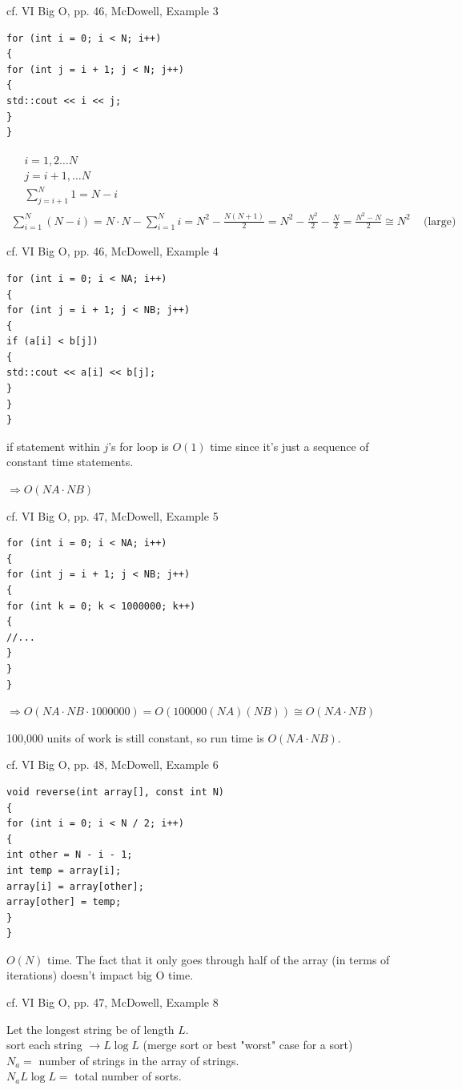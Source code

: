 \documentclass[10pt]{amsart}
\begin{document}
cf. VI Big O, pp. 46, McDowell, Example 3
\begin{verbatim}
for (int i = 0; i < N; i++)
{
for (int j = i + 1; j < N; j++)
{
std::cout << i << j;
}
}
\end{verbatim}
\[
\begin{gathered}
\begin{aligned}
& i = 1, 2 \dots N \\
& j = i+1, \dots N \\
& \sum_{j=i+1}^N 1 = N-i 
\end{aligned} \\
\sum_{i=1}^N (N-i) = N\cdot N  - \sum_{i=1}^N i = N^2 - \frac{N(N+1)}{2} = N^2 - \frac{N^2}{2} - \frac{N}{2} = \frac{N^2 - N}{2} \cong N^2 \quad \, \text{(large)}
\end{gathered}
\]

cf. VI Big O, pp. 46, McDowell, Example 4
\begin{verbatim}
for (int i = 0; i < NA; i++)
{
for (int j = i + 1; j < NB; j++)
{
if (a[i] < b[j])
{
std::cout << a[i] << b[j];
}
}
}
\end{verbatim}
if statement within $j$'s for loop is $O(1)$ time since it's just a sequence of constant time statements.

$\Longrightarrow O(NA \cdot NB)$

cf. VI Big O, pp. 47, McDowell, Example 5

\begin{verbatim}
for (int i = 0; i < NA; i++)
{
for (int j = i + 1; j < NB; j++)
{
for (int k = 0; k < 1000000; k++) 
{
//...
}
}
}
\end{verbatim}

$\Longrightarrow O(NA \cdot NB \cdot 1000000) = O(100000 (NA)(NB)) \cong O(NA\cdot NB)$

100,000 units of work is still constant, so run time is $O(NA\cdot NB)$.

cf. VI Big O, pp. 48, McDowell, Example 6

\begin{verbatim}
void reverse(int array[], const int N)
{
for (int i = 0; i < N / 2; i++)
{
int other = N - i - 1;
int temp = array[i];
array[i] = array[other];
array[other] = temp;
}
}
\end{verbatim}
$O(N)$ time. The fact that it only goes through half of the array (in terms of iterations) doesn't impact big O time.

cf. VI Big O, pp. 47, McDowell, Example 8

Let the longest string be of length $L$. \\
sort each string $\to L\log{L}$ (merge sort or best "worst" case for a sort) \\
$N_a= $ number of strings in the array of strings. \\
$N_a L \log{L} = $ total number of sorts. \\
\end{document}

